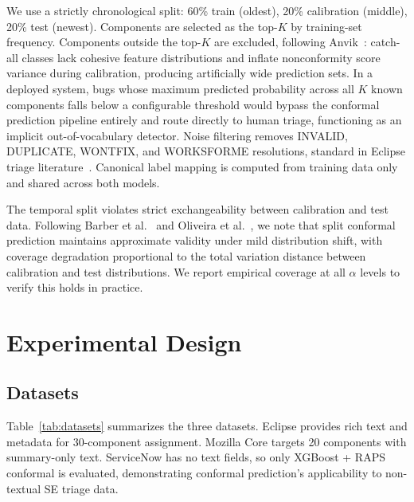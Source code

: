 \documentclass[conference]{IEEEtran}
\begin{document}
We use a strictly chronological split: 60\% train (oldest), 20\% calibration (middle), 20\% test (newest). Components are selected as the top-$K$ by training-set frequency. Components outside the top-$K$ are excluded, following Anvik~\cite{anvik2006should}: catch-all classes lack cohesive feature distributions and inflate nonconformity score variance during calibration, producing artificially wide prediction sets. In a deployed system, bugs whose maximum predicted probability across all $K$ known components falls below a configurable threshold would bypass the conformal prediction pipeline entirely and route directly to human triage, functioning as an implicit out-of-vocabulary detector. Noise filtering removes INVALID, DUPLICATE, WONTFIX, and WORKSFORME resolutions, standard in Eclipse triage literature~\cite{lamkanfi2013eclipse,dipongkor2023transformer}. Canonical label mapping is computed from training data only and shared across both models.

The temporal split violates strict exchangeability between calibration and test data. Following Barber et al.~\cite{barber2023conformal} and Oliveira et al.~\cite{oliveira2024split}, we note that split conformal prediction maintains approximate validity under mild distribution shift, with coverage degradation proportional to the total variation distance between calibration and test distributions. We report empirical coverage at all $\alpha$ levels to verify this holds in practice.

\section{Experimental Design}\label{sec:design}

\subsection{Datasets}

Table~\ref{tab:datasets} summarizes the three datasets. Eclipse provides rich text and metadata for 30-component assignment. Mozilla Core targets 20 components with summary-only text. ServiceNow has no text fields, so only XGBoost + RAPS conformal is evaluated, demonstrating conformal prediction's applicability to non-textual SE triage data.
\end{document}
